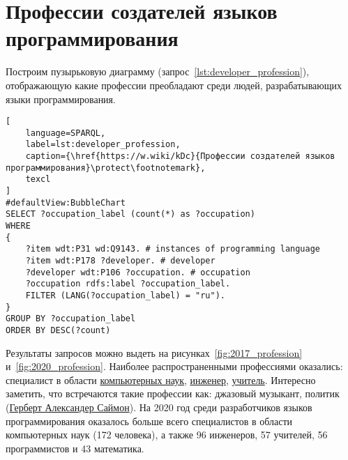 \section{Профессии создателей языков программирования}

\begin{marginfigure}[-302pt]
{
\setlength{\fboxsep}{0pt}
\setlength{\fboxrule}{1pt}
}
  \caption{Профессии людей, которые разрабатывают языки программирования (2017).}
  \label{fig:2017_profession}
\end{marginfigure}
\begin{marginfigure}[-52pt]
{
\setlength{\fboxsep}{0pt}
\setlength{\fboxrule}{1pt}
}
  \caption{Профессии людей, которые разрабатывают языки программирования (2020).}
  \label{fig:2020_profession}
\end{marginfigure}
Построим пузырьковую диаграмму (запрос~\ref{lst:developer_profession}), отображающую какие профессии преобладают среди людей, разрабатывающих языки программирования.

\begin{lstlisting}[
	language=SPARQL,
	label=lst:developer_profession,
	caption={\href{https://w.wiki/kDc}{Профессии создателей языков программирования}\protect\footnotemark},
	texcl
]
#defaultView:BubbleChart
SELECT ?occupation_label (count(*) as ?occupation)
WHERE
{
    ?item wdt:P31 wd:Q9143. # instances of programming language 
    ?item wdt:P178 ?developer. # developer
    ?developer wdt:P106 ?occupation. # occupation
    ?occupation rdfs:label ?occupation_label. 
    FILTER (LANG(?occupation_label) = "ru"). 
}
GROUP BY ?occupation_label 
ORDER BY DESC(?count)
\end{lstlisting}



Результаты запросов можно выдеть на рисунках~\ref{fig:2017_profession} и~\ref{fig:2020_profession}.
Наиболее распространенными профессиями оказались: специалист в области \href{https://www.wikidata.org/wiki/Q21198}{компьютерных наук}, \href{https://www.wikidata.org/wiki/Q81096}{инженер}, \href{https://www.wikidata.org/wiki/Q37226}{учитель}. Интересно заметить, что встречаются такие профессии как: джазовый музыкант, политик (\href{https://www.wikidata.org/wiki/Q181529}{Герберт Александер Саймон}). На 2020 год среди разработчиков языков программирования оказалось больше всего специалистов в области компьютерных наук (172 человека), а также 96 инженеров, 57 учителей, 56 программистов и 43 математика.

